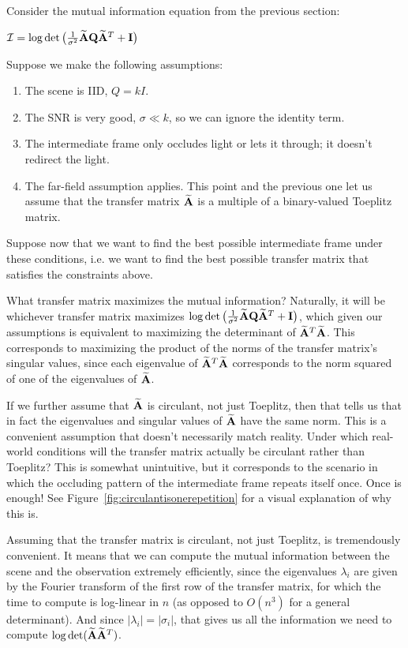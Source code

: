 Consider the mutual information equation from the previous section:

$\MI = %
\log\det\big( \frac{1}{\sigma^2}\An\Q\An^T + \Id \big)$

Suppose we make the following assumptions:

\begin{enumerate}
    \item The scene is IID, $Q = kI$.
    \item The SNR is very good, $\sigma \ll k$, so we can ignore the identity term.
    \item The intermediate frame only occludes light or lets it through; it doesn't redirect the light.
    \item The far-field assumption applies. This point and the previous one let us assume that the transfer matrix $\widetilde{\mathbf{A}}$ is a multiple of a binary-valued Toeplitz matrix.
\end{enumerate}    

Suppose now that we want to find the best possible intermediate frame under these conditions, i.e. we want to find the best possible transfer matrix that satisfies the constraints above. 

What transfer matrix maximizes the mutual information? Naturally, it will be whichever transfer matrix maximizes $\log\det\big( \frac{1}{\sigma^2}\widetilde{\mathbf{A}}\mathbf{Q}\widetilde{\mathbf{A}}^T + \mathbf{I} \big)$, which given our assumptions is equivalent to maximizing the determinant of $\widetilde{\mathbf{A}}^T \widetilde{\mathbf{A}}$. This corresponds to maximizing the product of the norms of the transfer matrix's singular values, since each eigenvalue of $\widetilde{\mathbf{A}}^T \widetilde{\mathbf{A}}$ corresponds to the norm squared of one of the eigenvalues of $\widetilde{\mathbf{A}}$.

If we further assume that $\widetilde{\mathbf{A}}$ is circulant, not just Toeplitz, then that tells us that in fact the eigenvalues and singular values of $\widetilde{\mathbf{A}}$ have the same norm. This is a convenient assumption that doesn't necessarily match reality. Under which real-world conditions will the transfer matrix actually be circulant rather than Toeplitz? This is somewhat unintuitive, but it corresponds to the scenario in which the occluding pattern of the intermediate frame repeats itself once. Once is enough! See Figure~\ref{fig:circulantisonerepetition} for a visual explanation of why this is.

Assuming that the transfer matrix is circulant, not just Toeplitz, is tremendously convenient. It means that we can compute the mutual information between the scene and the observation extremely efficiently, since the eigenvalues $\lambda_i$ are given by the Fourier transform of the first row of the transfer matrix, for which the time to compute is log-linear in $n$ (as opposed to $O(n^3)$ for a general determinant). And since $|\lambda_i| = |\sigma_i|$, that gives us all the information we need to compute $\log \det (\widetilde{\mathbf{A}} \widetilde{\mathbf{A}}^T)$.

